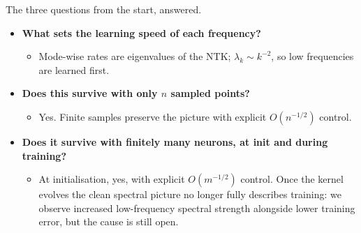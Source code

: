 \documentclass[aspectratio=169,9pt]{beamer}
\begin{document}
\begin{frame}
	{\textcolor{muted}{The three questions from the start, answered.}}

	\vspace{3mm}
	{\small
		\begin{itemize}
			\setlength{\itemsep}{4mm}
			\item[\questionnum{blue}{1}] {\bfseries What sets the learning speed of each frequency?}
			      \begin{itemize}\tightlist\scriptsize
				      \item Mode-wise rates are eigenvalues of the NTK; $\lambda_k\sim k^{-2}$, so low frequencies are learned first.
			      \end{itemize}

			      \pause
			\item[\questionnum{green}{2}] {\bfseries Does this survive with only $n$ sampled points?}
			      \begin{itemize}\tightlist\scriptsize
				      \item Yes. Finite samples preserve the picture with explicit $O(n^{-1/2})$ control.
			      \end{itemize}

			      \pause
			\item[\questionnum{orange}{3}] {\bfseries Does it survive with finitely many neurons, at init and during training?}
			      \begin{itemize}\tightlist\scriptsize
				      \item At initialisation, yes, with explicit $O(m^{-1/2})$ control. Once the kernel evolves the clean spectral picture no longer fully describes training: we observe increased low-frequency spectral strength alongside lower training error, but the cause is still open.
			      \end{itemize}
		\end{itemize}
	}
\end{frame}
\end{document}
